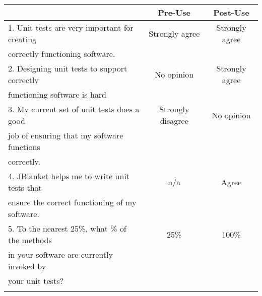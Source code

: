 \begin{tabular}{lcc} \\
 & {\bf Pre-Use} & {\bf Post-Use} \\ \hline
1. Unit tests are very important for creating & Strongly agree & Strongly agree \\
   correctly functioning software. \\ \hline

2. Designing unit tests to support correctly & No opinion & Strongly agree \\
   functioning software is hard\\ \hline

3. My current set of unit tests does a good & Strongly disagree & No opinion \\
   job of ensuring that my software functions \\
   correctly.\\ \hline

4. JBlanket helps me to write unit tests that & n/a & Agree \\
   ensure the correct functioning of my software.\\ \hline

5. To the nearest 25\%, what \% of the methods & 25\% & 100\% \\
   in your software are currently invoked by \\
   your unit tests?\\ \hline
\\
\end{tabular}

